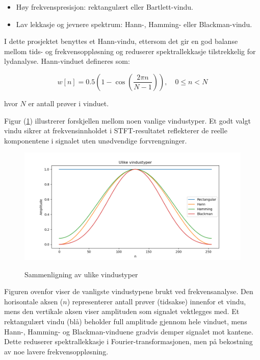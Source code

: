 \begin{itemize}
    \item Høy frekvenspresisjon: rektangulært eller Bartlett-vindu.  
    \item Lav lekkasje og jevnere spektrum: Hann-, Hamming- eller Blackman-vindu.  
\end{itemize}

I dette prosjektet benyttes et Hann-vindu, ettersom det gir en god balanse mellom tids- og 
frekvensoppløsning og reduserer spektrallekkasje tilstrekkelig for lydanalyse. 
Hann-vinduet defineres som:

\begin{equation*}
    w[n] = 0.5 \left(1 - \cos\left(\frac{2\pi n}{N-1}\right)\right), \quad 0 \leq n < N
\end{equation*}

hvor $N$ er antall prøver i vinduet.

Figur (\ref{fig:vinduer}) illustrerer forskjellen mellom noen vanlige vindustyper. 
Et godt valgt vindu sikrer at frekvensinnholdet i STFT-resultatet reflekterer de reelle 
komponentene i signalet uten unødvendige forvrengninger. \parencite{harris_windows_1978}

\begin{figure}[h]
    \includegraphics[width=\textwidth]{figurer/vindustyper.png}
    \label{fig:vinduer}
    \caption{Sammenligning av ulike vindustyper}
\end{figure}

Figuren ovenfor viser de vanligste vindustypene brukt ved frekvensanalyse. Den horisontale aksen ($n$) representerer antall 
prøver (tidsakse) innenfor et vindu, mens den vertikale aksen viser amplituden som signalet vektlegges med. Et rektangulært 
vindu (blå) beholder full amplitude gjennom hele vinduet, mens Hann-, Hamming- og Blackman-vinduene gradvis demper signalet 
mot kantene. Dette reduserer spektrallekkasje i Fourier-transformasjonen, men på bekostning av noe lavere frekvensoppløsning.
